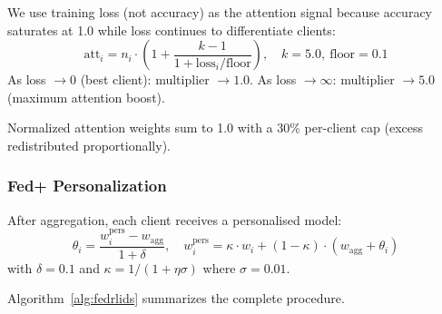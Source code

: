 \documentclass[conference]{IEEEtran}
\begin{document}
We use training loss (not accuracy) as the attention signal because accuracy saturates at 1.0 while loss continues to differentiate clients:
\begin{equation}
\mathrm{att}_i = n_i \cdot \left(1 + \frac{k - 1}{1 + \mathrm{loss}_i / \mathrm{floor}}\right), \quad k = 5.0,\ \mathrm{floor} = 0.1
\end{equation}
As loss $\to 0$ (best client): multiplier $\to 1.0$. As loss $\to \infty$: multiplier $\to 5.0$ (maximum attention boost).

Normalized attention weights sum to 1.0 with a 30\% per-client cap (excess redistributed proportionally).

\subsubsection{Fed+ Personalization}

After aggregation, each client receives a personalised model:
\begin{equation}
\theta_i = \frac{w_i^{\mathrm{pers}} - w_{\mathrm{agg}}}{1 + \delta}, \quad
w_i^{\mathrm{pers}} = \kappa \cdot w_i + (1 - \kappa)\cdot(w_{\mathrm{agg}} + \theta_i)
\end{equation}
with $\delta = 0.1$ and $\kappa = 1/(1 + \eta\sigma)$ where $\sigma = 0.01$.

Algorithm~\ref{alg:fedrlids} summarizes the complete procedure.
\end{document}
